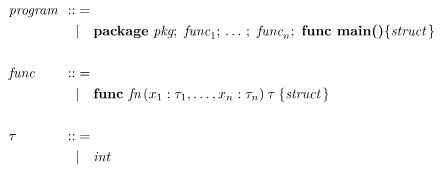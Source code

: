 \begin{fleqn}
        \begin{align*}
                 & \textit{program} \hspace{-0.1cm} & :: & =                                                                                                                                                                &  &                                    \\
                 & \hspace{-0.1cm}                  &    & | \ \ \ \textbf{package} \ \textit{pkg}; \ \textit{func}_1; \, \ldots \, ; \ \textit{func}_n; \ \textbf{func main()} \{ \textit{struct} \, \}                    &  &                                    \\
                 & \hspace{-0.1cm}                  &    &                                                                                                                                                                  &  &                                    \\
                 & \textit{func}    \hspace{-0.1cm} & :: & =                                                                                                                                                                &  &                                    \\
                 & \hspace{-0.1cm}                  &    & | \ \ \ \textbf{func } \textit{fn} \, (x_1: \tau_1, \ldots, x_n: \tau_n ) \: \tau \: \{ \textit{struct} \, \}                                                    &  &                                    \\
                 & \hspace{-0.1cm}                  &    &                                                                                                                                                                  &  &                                    \\
                 & \tau             \hspace{-0.1cm} & :: & =                                                                                                                                                                &  &                                    \\
                 & \hspace{-0.1cm}                  &    & | \ \ \ \textit{int}                                                                                                                                             &  &                                    \\

\end{align*}
\end{fleqn}
